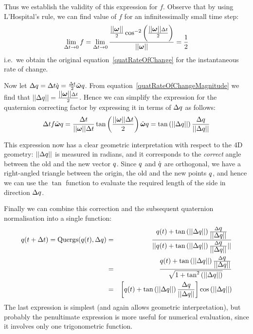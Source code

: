 Thus we establish the validity of this expression for $f$. Observe that by using 
L'Hospital's rule, we can find value of $f$ for an infinitessimally small time step:
$$
\lim_{\Delta t \to 0} f = \lim_{\Delta t \to 0} \frac{ \frac{\norm{\ve{\omega}}}{2}
    \cos^{-2}\left(\frac{\norm{\ve{\omega}}\Delta t}{2}\right) }{ \norm{\ve{\omega}} } =
    \frac{1}{2}
$$
i.e.\ we obtain the original equation~\ref{quatRateOfChange} for the
instantaneous rate of change.

Now let $\Delta \q{q} = \Delta t \dot{\q{q}} =
    \frac{\Delta t}{2} \tilde{\ve{\omega}} \q{q}$.
From equation~\ref{quatRateOfChangeMagnitude} we find that
$\norm{\Delta\q{q}} = \frac{\norm{\ve{\omega}}\Delta t}{2}$.
Hence we can simplify the expression for the quaternion correcting factor by expressing it
in terms of $\Delta \mbox{$q$}$ as follows:
$$
\Delta t f \tilde{\ve{\omega}}\q{q} = \frac{\Delta t}{\norm{\ve{\omega}}\Delta t}
    \tan\left(\frac{\norm{\ve{\omega}}\Delta t}{2}\right) \tilde{\ve{\omega}} \q{q} =
    \tan\left(\norm{\Delta\q{q}}\right) \frac{\Delta\q{q}}{\norm{\Delta\q{q}}}
$$

This expression now has a clear geometric interpretation with respect to the 4D geometry:
$\mbox{$||\Delta\mbox{$q$}||$}$ is measured in radians, and it corresponds to the \emph{correct}
angle between the old and the new vector $\mbox{$q$}$. Since $\mbox{$q$}$ and
$\dot{\mbox{$q$}}$ are orthogonal, we have a right-angled triangle between the origin,
the old and the new points $\mbox{$q$}$, and hence we can use the $\tan$ function to
evaluate the required length of the side in direction $\Delta\mbox{$q$}$.

Finally we can combine this correction and the subsequent quaternion normalisation into
a single function:
\begin{eqnarray*}
\mbox{$q$}(t+\Delta t) = \mathrm{Quergs}(\mbox{$q$}(t), \Delta\mbox{$q$}) &=&
    \frac{\mbox{$q$}(t) + \tan\left(\mbox{$||\Delta\mbox{$q$}||$}\right)
        \frac{\Delta\mbox{$q$}}{\mbox{$||\Delta\mbox{$q$}||$}}}{
    \mbox{$||\mbox{$q$}(t) + \tan\left(\mbox{$||\Delta\mbox{$q$}||$}\right)
        \frac{\Delta\mbox{$q$}}{\mbox{$||\Delta\mbox{$q$}||$}}||$}} \\
&=& \frac{\mbox{$q$}(t) + \tan\left(\mbox{$||\Delta\mbox{$q$}||$}\right)
        \frac{\Delta\mbox{$q$}}{\mbox{$||\Delta\mbox{$q$}||$}}}{
    \sqrt{1 + \tan^2\left(\mbox{$||\Delta\mbox{$q$}||$}\right)}} \\
&=& \left[\mbox{$q$}(t) + \tan\left(\mbox{$||\Delta\mbox{$q$}||$}\right)
        \frac{\Delta\mbox{$q$}}{\mbox{$||\Delta\mbox{$q$}||$}}\right]
    \cos\left(\mbox{$||\Delta\mbox{$q$}||$}\right)
\end{eqnarray*}
The last expression is simplest (and again allows geometric interpretation), but probably
the penultimate expression is more useful for numerical evaluation, since it involves only
one trigonometric function.
